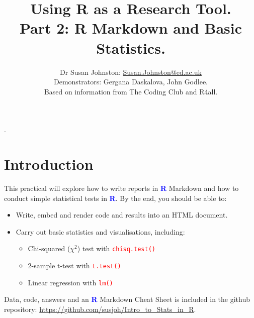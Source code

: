 \documentclass[a4paper,12pt]{article}
\newcommand\boldblue[1]{\textcolor{blue}{\textbf{#1}}}
\newcommand\code[1]{\textcolor{red}{\texttt{#1}}}
\begin{document}





\title{Using R as a Research Tool.\\
Part 2: R Markdown and Basic Statistics.}

\author{\small{Dr Susan Johnston: \href{mailto:Susan.Johnston@ed.ac.uk}{Susan.Johnston@ed.ac.uk}}  \\
        \small{Demonstrators: Gergana Daskalova, John Godlee.} \\
        \small{Based on information from The Coding Club and R4all.}}
\date{}






\maketitle


\vspace*{-2.5cm}.
\section {Introduction}

This practical will explore how to write reports in \boldblue{R} Markdown and how to conduct simple statistical tests in \boldblue{R}. By the end, you should be able to:

\begin{itemize}

\item Write, embed and render code and results into an HTML document.

\item Carry out basic statistics and visualisations, including:

\begin{itemize}

\item Chi-squared ($\chi^{2}$) test with \code{chisq.test()}
\item 2-sample t-test with \code{t.test()}
\item Linear regression with \code{lm()}


\end{itemize}

\end{itemize}
Data, code, answers and an \boldblue{R} Markdown Cheat Sheet is included in the github repository: \url{https://github.com/susjoh/Intro_to_Stats_in_R}.
\end{document}
